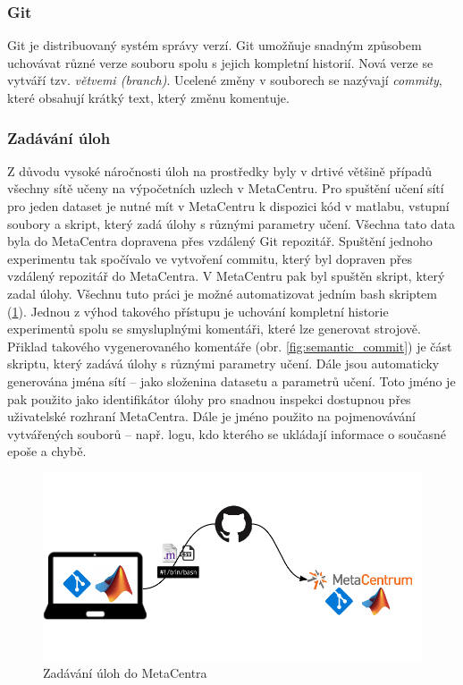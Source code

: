 \documentclass[thesis=M,czech]{FITthesis}[2012/06/26]
\begin{document}
\subsubsection*{Git}
Git je distribuovaný systém správy verzí. Git umožňuje snadným způsobem uchovávat různé verze souboru spolu s jejich kompletní historií. Nová verze se vytváří tzv. \textit{větvemi (branch)}. Ucelené změny v souborech se nazývají \textit{commity}, které  obsahují krátký text, který změnu komentuje.


\subsubsection*{Zadávání úloh}
Z důvodu vysoké náročnosti úloh na prostředky byly v drtivé většině případů všechny sítě učeny na výpočetních uzlech v MetaCentru. Pro spuštění učení sítí pro jeden dataset je nutné mít v MetaCentru k dispozici kód v matlabu, vstupní soubory a skript, který zadá úlohy s různými parametry učení. Všechna tato data byla do MetaCentra dopravena přes vzdálený Git repozitář. Spuštění jednoho experimentu tak spočívalo ve vytvoření commitu, který byl dopraven přes vzdálený repozitář do MetaCentra. V MetaCentru pak byl spuštěn skript, který zadal úlohy. Všechnu tuto práci je možné automatizovat jedním bash skriptem (\ref{fig:up}). 
Jednou z výhod takového přístupu je uchování kompletní historie experimentů spolu se smysluplnými komentáři, které lze generovat strojově. Přiklad takového vygenerovaného komentáře (obr. \ref{fig:semantic_commit}) je část skriptu, který zadává úlohy s různými parametry učení. Dále jsou automaticky generována jména sítí -- jako složenina datasetu a parametrů učení. Toto jméno je pak použito jako identifikátor úlohy pro snadnou inspekci dostupnou přes uživatelské rozhraní MetaCentra. Dále je jméno použito na pojmenovávání vytvářených souborů -- např. logu, kdo kterého se ukládají informace o současné epoše a chybě.

\begin{figure}[htbp]
\begin{center}
	\includegraphics[scale=0.9]{up.png}
\caption{Zadávání úloh do MetaCentra}
\label{fig:up}
\end{center}
\end{figure}
\end{document}
